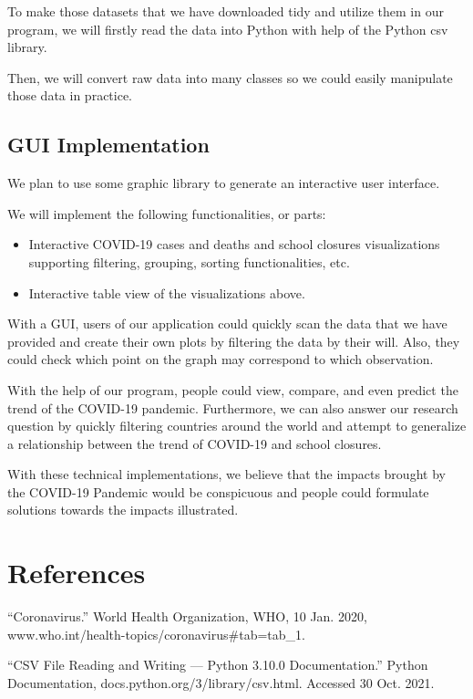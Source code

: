 \documentclass[fontsize=11pt]{article}
\begin{document}
To make those datasets that we have downloaded tidy and utilize them in our program, we will firstly read the data into Python with help of the Python csv library.

Then, we will convert raw data into many classes so we could easily manipulate those data in practice.

\subsection*{GUI Implementation}

We plan to use some graphic library to generate an interactive user interface.

We will implement the following functionalities, or parts:

\begin{itemize}
    \item Interactive COVID-19 cases and deaths and school closures visualizations supporting filtering, grouping, sorting functionalities, etc.
    \item Interactive table view of the visualizations above.
\end{itemize}

With a GUI, users of our application could quickly scan the data that we have provided and create their own plots by filtering the data by their will. Also, they could check which point on the graph may correspond to which observation.

With the help of our program, people could view, compare, and even predict the trend of the COVID-19 pandemic. Furthermore, we can also answer our research question by quickly filtering countries around the world and attempt to generalize a relationship between the trend of COVID-19 and school closures.

With these technical implementations, we believe that the impacts brought by the COVID-19 Pandemic would be conspicuous and people could formulate solutions towards the impacts illustrated.

\newpage

\section*{References}

“Coronavirus.” World Health Organization, WHO, 10 Jan. 2020, www.who.int/health-topics/coronavirus\#tab=tab\_1.

“CSV File Reading and Writing — Python 3.10.0 Documentation.” Python Documentation, docs.python.org/3/library/csv.html. Accessed 30 Oct. 2021.
\end{document}
